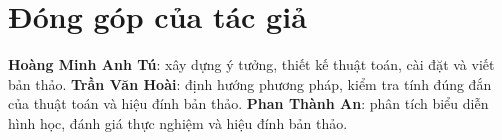 
\section{Đóng góp của tác giả}

\textbf{Hoàng Minh Anh Tú}: xây dựng ý tưởng, thiết kế thuật toán, cài đặt
và viết bản thảo. \textbf{Trần Văn Hoài}: định hướng phương pháp, kiểm tra
tính đúng đắn của thuật toán và hiệu đính bản thảo. \textbf{Phan Thành An}:
phân tích biểu diễn hình học, đánh giá thực nghiệm và hiệu đính bản thảo.
